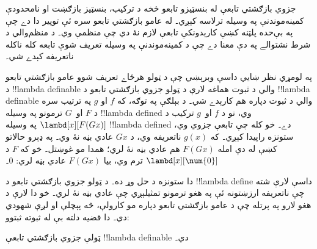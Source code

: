\documentclass[../../../include/open-logic-section]{subfiles}
\begin{document}

جزوي بازګشتي تابعې له بنسټيزو تابعو څخه د ترکيب،
بنسټيز بازګښت او نامحدودې کمينه‌موندنې په وسيله
ترلاسه کېږي۔ له عامو بازګشتي تابعو سره ئې توپير
دا دے چې په بې‌حده پلټنه کښې کارېدونکې تابعې
لازم نۀ دي چې منظمې وي۔ د منظم‌والي د شرط نشتوالے
په دې معنا دے چې د کمينه‌موندنې په وسيله تعريف شوې
تابعه کله ناکله ناتعريفه کېدے شي۔

په لومړي نظر ښايي داسې وبرېښي چې د ټولو هرځاے
تعريف شوو عامو بازګشتي تابعو د !!{lambda definable}
والي د ثبوت هماغه لارې د ټولو جزوي بازګشتي تابعو
د !!{lambda definable} والي د ثبوت دپاره هم کارېدے شي۔
د بېلګې په توګه، که $f$ او $g$ په ترتيب سره د $F$
او~$G$ ترمونو په وسيله !!{lambda define}d وي،
نو د $f$ او~$g$ ترکيب د
$\lambd[x][F (G x)]$ په وسيله !!{lambda define}d
دے۔ خو کله چې تابعې جزوي وي، ستونزه راپيدا کېږي۔
که $g(x)$ ناتعريفه وي، د $G x$ عادي بڼه نۀ وي۔
په ډېرو حالاتو کښې له دې امله $F (G x)$ هم عادي
بڼه نۀ لري؛ همدا مو غوښتل۔ خو که $F$ د
$\lambd[x][\num{0}]$ ترم وي، بيا $F (G x)$
عادي بڼه لري: $\num{0}$۔

دا ستونزه د حل وړ ده۔ د ټولو جزوي بازګشتي تابعو
د !!{lambda define} داسې لارې شته چې ناتعريفه
ارزښتونه ئې په هغو ترمونو تمثيلېږي چې عادي بڼه نۀ لري۔ خو دا
لارې د هغو لارو په پرتله چې د عامو بازګشتي تابعو
دپاره مو کارولې، څه پېچلې او لږې شهودي دي۔ دا قضيه
دلته بې له ثبوته ثبتوو:

\begin{thm}
  ټولې جزوي بازګشتي تابعې !!{lambda definable} دي۔
\end{thm}
\end{document}
